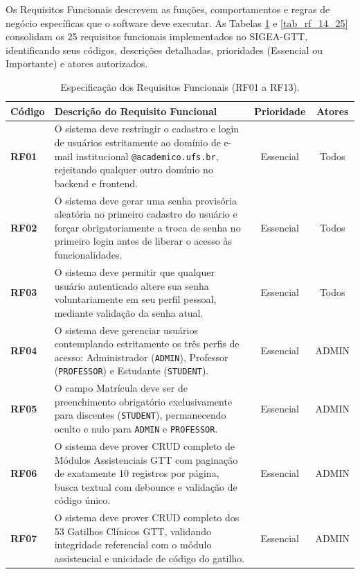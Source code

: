 Os Requisitos Funcionais descrevem as funções, comportamentos e regras de negócio específicas que o software deve executar. As Tabelas \ref{tab_rf_1_13} e \ref{tab_rf_14_25} consolidam os 25 requisitos funcionais implementados no SIGEA-GTT, identificando seus códigos, descrições detalhadas, prioridades (Essencial ou Importante) e atores autorizados.

\begin{table}[htb]
\centering
\small
\caption{Especificação dos Requisitos Funcionais (RF01 a RF13).}
\label{tab_rf_1_13}
\begin{tabularx}{\textwidth}{l X c c}
\toprule
\textbf{Código} & \textbf{Descrição do Requisito Funcional} & \textbf{Prioridade} & \textbf{Atores} \\
\midrule
\textbf{RF01} & O sistema deve restringir o cadastro e login de usuários estritamente ao domínio de e-mail institucional \texttt{@academico.ufs.br}, rejeitando qualquer outro domínio no backend e frontend. & Essencial & Todos \\
\midrule
\textbf{RF02} & O sistema deve gerar uma senha provisória aleatória no primeiro cadastro do usuário e forçar obrigatoriamente a troca de senha no primeiro login antes de liberar o acesso às funcionalidades. & Essencial & Todos \\
\midrule
\textbf{RF03} & O sistema deve permitir que qualquer usuário autenticado altere sua senha voluntariamente em seu perfil pessoal, mediante validação da senha atual. & Essencial & Todos \\
\midrule
\textbf{RF04} & O sistema deve gerenciar usuários contemplando estritamente os três perfis de acesso: Administrador (\texttt{ADMIN}), Professor (\texttt{PROFESSOR}) e Estudante (\texttt{STUDENT}). & Essencial & ADMIN \\
\midrule
\textbf{RF05} & O campo Matrícula deve ser de preenchimento obrigatório exclusivamente para discentes (\texttt{STUDENT}), permanecendo oculto e nulo para \texttt{ADMIN} e \texttt{PROFESSOR}. & Essencial & ADMIN \\
\midrule
\textbf{RF06} & O sistema deve prover CRUD completo de Módulos Assistenciais GTT com paginação de exatamente 10 registros por página, busca textual com debounce e validação de código único. & Essencial & ADMIN \\
\midrule
\textbf{RF07} & O sistema deve prover CRUD completo dos 53 Gatilhos Clínicos GTT, validando integridade referencial com o módulo assistencial e unicidade de código do gatilho. & Essencial & ADMIN \\

\end{tabularx}
\end{table}

